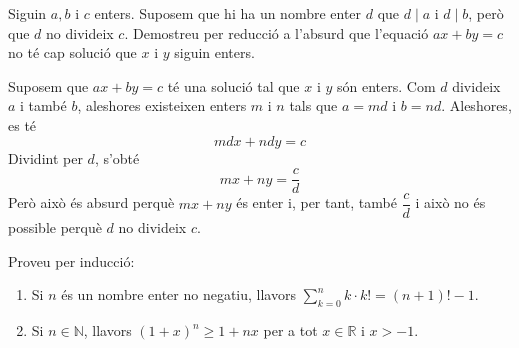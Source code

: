 \begin{exer}
Siguin $a,b$ i $c$ enters. Suposem que hi ha un nombre enter $d$ que $d\mid a
$ i $d\mid b$, per\`{o} que $d$ no divideix $c$. Demostreu per reducci\'{o} a
l'absurd que l'equaci\'{o} $ax+by=c$ no t\'{e} cap soluci\'{o} que $x$ i $y $
siguin enters.
\end{exer}

\begin{solucio}
Suposem que $ax+by=c$ t\'{e} una soluci\'{o} tal que $x$ i $y$ s\'{o}n enters.
Com $d$ divideix $a$ i tamb\'{e} $b$, aleshores existeixen enters $m$ i $n$
tals que $a=md$ i $b=nd$. Aleshores, es t\'{e}%
\[
mdx+ndy=c
\]
Dividint per $d$, s'obt\'{e}%
\[
mx+ny=\frac{c}{d}%
\]
Per\`{o} aix\`{o} \'{e}s absurd perqu\`{e} $mx+ny$ \'{e}s enter i, per tant,
tamb\'{e} $\dfrac{c}{d}$ i aix\`{o} no \'{e}s possible perqu\`{e} $d$ no
divideix $c$.
\end{solucio}

\begin{exer}
Proveu per inducci\'{o}:

\begin{enumerate}
\item Si $n$ \'{e}s un nombre enter no negatiu, llavors $%
{\displaystyle\sum\limits_{k=0}^{n}}
k\cdot k!=\left(  n+1\right)  !-1$.

\item Si $n\in\mathbb{N}$, llavors $\left(  1+x\right)  ^{n}\geq1+nx$ per a
tot $x\in\mathbb{R}$ i $x>-1$.
\end{enumerate}
\end{exer}

